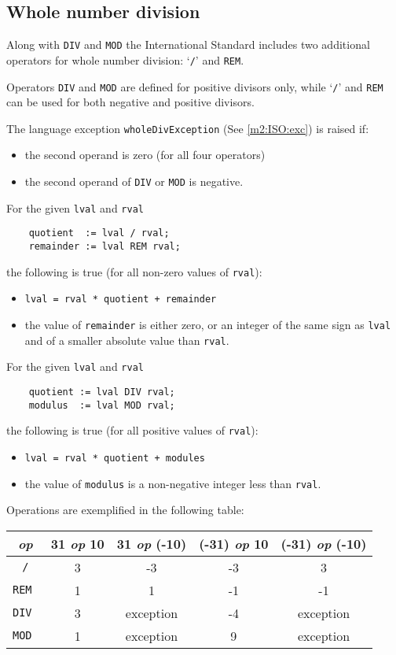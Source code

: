 \subsection{Whole number division}\label{m2:ISO:rem}

Along with {\tt DIV} and {\tt MOD} the International Standard
includes two additional operators for whole number division:
`\verb+/+' and {\tt REM}.

Operators {\tt DIV} and {\tt MOD} are defined for positive
divisors only, while `\verb+/+' and {\tt REM} can be used for
both negative and positive divisors.

The language exception {\tt wholeDivException} (See \ref{m2:ISO:exc})
is raised if:
\begin{itemize}
\item the second operand is zero (for all four operators)
\item the second operand of {\tt DIV} or {\tt MOD} is negative.
\end{itemize}

For the given {\tt lval} and {\tt rval}

\verb'    quotient  := lval / rval;'\\
\verb'    remainder := lval REM rval;'

the following is true (for all non-zero values of {\tt rval}):
\begin{itemize}
\item \verb'lval = rval * quotient + remainder'

\item the value of {\tt remainder} is either zero, or an integer of
the same sign as {\tt lval} and of a smaller absolute value than {\tt rval}.
\end{itemize}

For the given {\tt lval} and {\tt rval}

\verb'    quotient := lval DIV rval;'\\
\verb'    modulus  := lval MOD rval;'

the following is true (for all positive values of {\tt rval}):
\begin{itemize}
\item \verb'lval = rval * quotient + modules'

\item the value of {\tt modulus} is a non-negative integer
less than {\tt rval}.
\end{itemize}

Operations are exemplified in the following table:
\begin{center}
\begin{tabular}{c|c|c|c|c}
{\em op} & 31 {\em op} 10 & 31 {\em op} (-10) & (-31) {\em op} 10 & (-31) {\em op} (-10) \\
\hline
\verb+/+ &  3  & -3         &  -3  & 3          \\
\tt REM  &  1  & 1          &  -1  & -1         \\
\tt DIV  &  3  & exception  &  -4  & exception  \\
\tt MOD  &  1  & exception  &   9  & exception  \\
\end{tabular}
\end{center}

